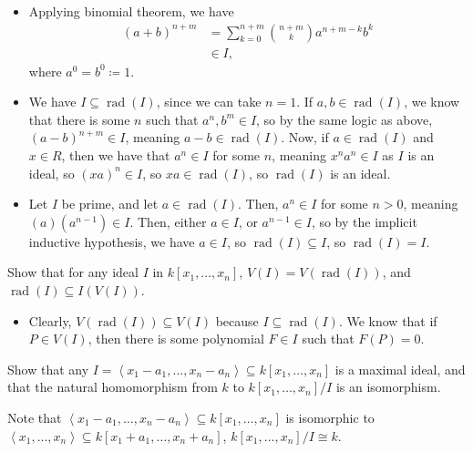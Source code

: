 \documentclass[10pt]{mypackage}
\begin{document}
\begin{solution}\hfill
  \begin{itemize}
    \item Applying binomial theorem, we have
      \begin{align*}
        \left(a+b\right)^{n+m} &= \sum_{k=0}^{n+m}{n+m\choose k}a^{n+m-k}b^{k}\\
                               &\in I,
      \end{align*}
      where $a^0 = b^{0}\coloneq 1$.
    \item We have $I\subseteq \operatorname{rad}\left(I\right)$, since we can take $n = 1$. If $a,b\in \operatorname{rad}\left(I\right)$, we know that there is some $n$ such that $a^n,b^m\in I$, so by the same logic as above, $\left(a-b\right)^{n+m}\in I$, meaning $a-b\in \operatorname{rad}\left(I\right)$. Now, if $a\in \operatorname{rad}\left(I\right)$ and $x\in R$, then we have that $a^n\in I$ for some $n$, meaning $x^na^n\in I$ as $I$ is an ideal, so $\left(xa\right)^n\in I$, so $xa\in \operatorname{rad}\left(I\right)$, so $\operatorname{rad}\left(I\right)$ is an ideal.
    \item Let $I$ be prime, and let $a\in \operatorname{rad}\left(I\right)$. Then, $a^{n}\in I$ for some $n > 0$, meaning $(a)\left(a^{n-1}\right)\in I$. Then, either $a\in I$, or $a^{n-1}\in I$, so by the implicit inductive hypothesis,  we have $a\in I$, so $\operatorname{rad}\left(I\right)\subseteq I$, so $\operatorname{rad}\left(I\right) = I$.
  \end{itemize}
\end{solution}
\begin{exercise}[Exercise 1.20]
  Show that for any ideal $I$ in $k\left[x_1,\dots,x_n\right]$, $V(I) = V\left(\operatorname{rad}\left(I\right)\right)$, and $\operatorname{rad}\left(I\right)\subseteq I\left(V\left(I\right)\right)$.
\end{exercise}
\begin{solution}\hfill
  \begin{itemize}
    \item Clearly, $V\left(\operatorname{rad}\left(I\right)\right)\subseteq V(I)$ because $I\subseteq \operatorname{rad}\left(I\right)$. We know that if $P\in V(I)$, then there is some polynomial $F\in I$ such that $F(P) = 0$.
  \end{itemize}
\end{solution}

\begin{exercise}[Exercise 1.21]
Show that any $I = \left\langle x_1 - a_1,\dots,x_n-a_n \right\rangle\subseteq k\left[x_1,\dots,x_n\right]$ is a maximal ideal, and that the natural homomorphism from $k$ to $k\left[x_1,\dots,x_n\right]/I$ is an isomorphism.
\end{exercise}
\begin{solution}
  Note that $\left\langle x_1-a_1,\dots,x_n-a_n \right\rangle\subseteq k\left[x_1,\dots,x_n\right]$ is isomorphic to $\left\langle x_1,\dots,x_n \right\rangle\subseteq k\left[x_1 + a_1,\dots,x_n + a_n\right]$, $k\left[x_1,\dots,x_n\right]/I \cong k$.
\end{solution}
\end{document}
